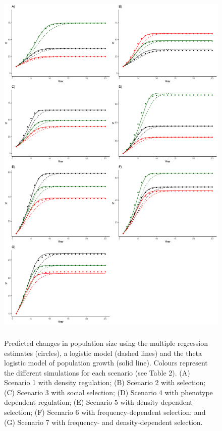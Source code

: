 \documentclass{article}
\begin{document}
\begin{figure}[h] 
	\centering
	\includegraphics[width=12cm, height=18cm]{Figures/FigS4.pdf}
	\caption{Predicted changes in population size using the multiple regression estimates (circles), a logistic model (dashed lines) and the theta logistic model of population growth (solid line). Colours represent the different simulations for each scenario (see Table 2). (A) Scenario 1 with density regulation; (B) Scenario 2 with selection; (C) Scenario 3 with social selection; (D) Scenario 4 with phenotype dependent regulation; (E) Scenario 5 with density dependent-selection; (F) Scenario 6 with frequency-dependent selection; and (G) Scenario 7 with frequency- and density-dependent selection.} 
	\label{fig:growth}
\end{figure}


 
\end{document}
